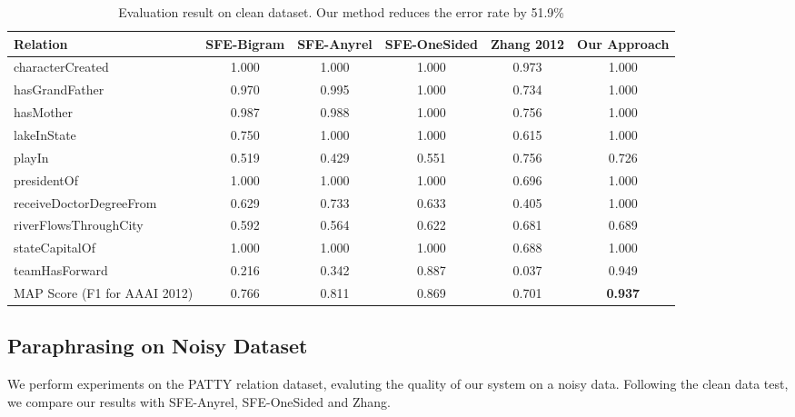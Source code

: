 \begin{table*}[ht]
	\centering
	\caption{Evaluation result on clean dataset. Our method reduces
	the error rate by 51.9\%}
	\label{tab:result-clean}
	\begin{tabular}{|l|c|c|c|c|c|}
		\hline
			Relation & SFE-Bigram & SFE-Anyrel & SFE-OneSided & Zhang 2012 & Our Approach \\
		\hline
			characterCreated & 1.000 & 1.000 & 1.000 & 0.973 & 1.000 \\
		\hline
			hasGrandFather & 0.970 & 0.995  & 1.000 & 0.734 & 1.000 \\
		\hline
			hasMother & 0.987 & 0.988 & 1.000 & 0.756 & 1.000 \\
		\hline
			lakeInState & 0.750 & 1.000  & 1.000 & 0.615 & 1.000 \\
		\hline
			playIn & 0.519 & 0.429 & 0.551 & 0.756 & 0.726 \\
		\hline
			presidentOf & 1.000 & 1.000 & 1.000 & 0.696 & 1.000 \\
		\hline
			receiveDoctorDegreeFrom & 0.629 & 0.733 & 0.633 & 0.405 & 1.000  \\
		\hline
			riverFlowsThroughCity & 0.592 & 0.564 & 0.622 & 0.681 & 0.689 \\
		\hline
			stateCapitalOf & 1.000 & 1.000 & 1.000 & 0.688 & 1.000 \\
		\hline
			teamHasForward & 0.216 & 0.342 & 0.887 & 0.037 & 0.949 \\
		\hline
			MAP Score (F1 for AAAI 2012) & 0.766 & 0.811 & 0.869 & 0.701 & \textbf{0.937} \\
		\hline
	\end{tabular}
\end{table*}

\subsection{Paraphrasing on Noisy Dataset}
We perform experiments on the PATTY relation dataset, evaluting the quality
of our system on a noisy data.
Following the clean data test, we compare our results with SFE-Anyrel, SFE-OneSided
and Zhang.


